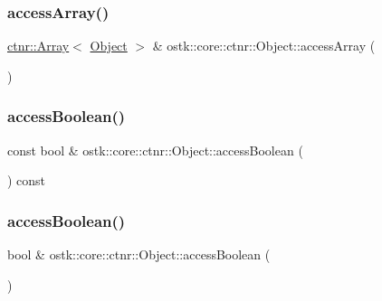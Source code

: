 \subsubsection{\texorpdfstring{access\+Array()}{accessArray()}\hspace{0.1cm}{\footnotesize\ttfamily [2/2]}}
{\footnotesize\ttfamily \hyperlink{classostk_1_1core_1_1ctnr_1_1_array}{ctnr\+::\+Array}$<$ \hyperlink{classostk_1_1core_1_1ctnr_1_1_object}{Object} $>$ \& ostk\+::core\+::ctnr\+::\+Object\+::access\+Array (\begin{DoxyParamCaption}{ }\end{DoxyParamCaption})}

\mbox{\label{classostk_1_1core_1_1ctnr_1_1_object_a21cb04fd35ab6d4b468a9e11ade4def4}} 
\subsubsection{\texorpdfstring{access\+Boolean()}{accessBoolean()}\hspace{0.1cm}{\footnotesize\ttfamily [1/2]}}
{\footnotesize\ttfamily const bool \& ostk\+::core\+::ctnr\+::\+Object\+::access\+Boolean (\begin{DoxyParamCaption}{ }\end{DoxyParamCaption}) const}

\mbox{\label{classostk_1_1core_1_1ctnr_1_1_object_a4a8702eed7ae8c39e297050f1037abcb}} 
\subsubsection{\texorpdfstring{access\+Boolean()}{accessBoolean()}\hspace{0.1cm}{\footnotesize\ttfamily [2/2]}}
{\footnotesize\ttfamily bool \& ostk\+::core\+::ctnr\+::\+Object\+::access\+Boolean (\begin{DoxyParamCaption}{ }\end{DoxyParamCaption})}

